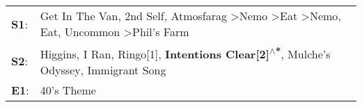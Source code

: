 \begin{supertabular}{p{0.03\textwidth}p{0.92\textwidth}}
 \textbf{S1}:  &  Get In The Van\textsuperscript{}, \enspace 2nd Self\textsuperscript{}, \enspace Atmosfarag\textsuperscript{} \textgreater \enspace Nemo\textsuperscript{} \textgreater \enspace Eat\textsuperscript{} \textgreater \enspace Nemo\textsuperscript{}, \enspace Eat\textsuperscript{}, \enspace Uncommon\textsuperscript{} \textgreater \enspace Phil's Farm\textsuperscript{}  \enspace  \\
 \textbf{S2}:  &                                                                                                                   Higgins\textsuperscript{}, \enspace I Ran\textsuperscript{}, \enspace Ringo[1]\textsuperscript{}, \enspace \textbf{Intentions Clear[2]\textsuperscript{$\wedge$*}}, \enspace Mulche's Odyssey\textsuperscript{}, \enspace Immigrant Song\textsuperscript{}  \enspace  \\
 \textbf{E1}:  &                                                                                                                                                                                                                                                                                                                                                 40's Theme\textsuperscript{}  \enspace  \\
\end{supertabular}
